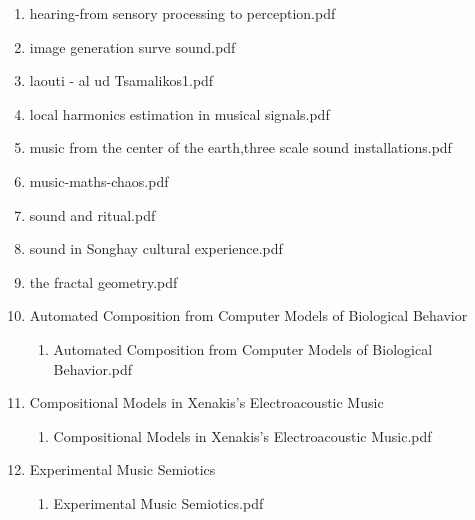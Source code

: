 \documentclass[11pt]{article}
\begin{document}
\begin{enumerate}
\item hearing-from sensory  processing to perception.pdf
\label{sec-1-1-1-1-11-19-27-47}

\item image generation surve sound.pdf
\label{sec-1-1-1-1-11-19-27-48}

\item laouti - al ud Tsamalikos1.pdf
\label{sec-1-1-1-1-11-19-27-49}

\item local harmonics estimation in musical signals.pdf
\label{sec-1-1-1-1-11-19-27-50}

\item music from the center of the earth,three scale sound installations.pdf
\label{sec-1-1-1-1-11-19-27-51}

\item music-maths-chaos.pdf
\label{sec-1-1-1-1-11-19-27-52}

\item sound and ritual.pdf
\label{sec-1-1-1-1-11-19-27-53}

\item sound in Songhay cultural experience.pdf
\label{sec-1-1-1-1-11-19-27-54}

\item the fractal geometry.pdf
\label{sec-1-1-1-1-11-19-27-55}

\item Automated Composition from Computer Models of Biological Behavior
\label{sec-1-1-1-1-11-19-27-56}
\begin{enumerate}
\item Automated Composition from Computer Models of Biological Behavior.pdf
\label{sec-1-1-1-1-11-19-27-56-1}
\end{enumerate}

\item Compositional Models in Xenakis's Electroacoustic Music
\label{sec-1-1-1-1-11-19-27-57}
\begin{enumerate}
\item Compositional Models in Xenakis's Electroacoustic Music.pdf
\label{sec-1-1-1-1-11-19-27-57-1}
\end{enumerate}

\item Experimental Music Semiotics
\label{sec-1-1-1-1-11-19-27-58}
\begin{enumerate}
\item Experimental Music Semiotics.pdf
\label{sec-1-1-1-1-11-19-27-58-1}
\end{enumerate}


\end{enumerate}
\end{document}
